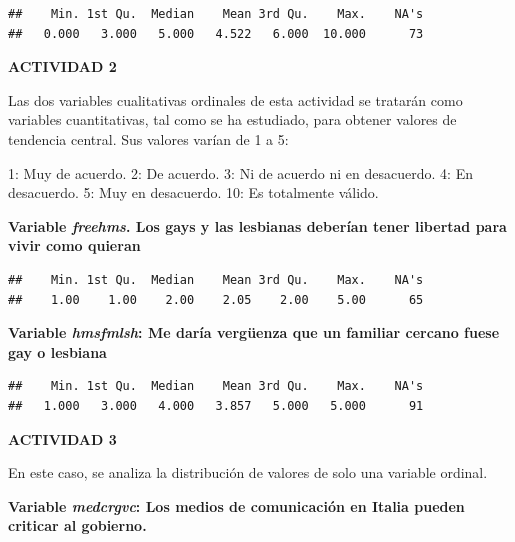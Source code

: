 \documentclass[
  12 pt,
  a4paper,
]{article}
\newenvironment{Shaded}{\begin{snugshade}}{\end{snugshade}}
\newcommand{\FunctionTok}[1]{\textcolor[rgb]{0.13,0.29,0.53}{\textbf{#1}}}
\newcommand{\NormalTok}[1]{#1}
\newcommand{\SpecialCharTok}[1]{\textcolor[rgb]{0.81,0.36,0.00}{\textbf{#1}}}
\begin{document}
\begin{verbatim}
##    Min. 1st Qu.  Median    Mean 3rd Qu.    Max.    NA's 
##   0.000   3.000   5.000   4.522   6.000  10.000      73
\end{verbatim}

\textbf{ACTIVIDAD 2}

Las dos variables cualitativas ordinales de esta actividad se tratarán
como variables cuantitativas, tal como se ha estudiado, para obtener
valores de tendencia central. Sus valores varían de 1 a 5:

1: Muy de acuerdo. 2: De acuerdo. 3: Ni de acuerdo ni en desacuerdo. 4:
En desacuerdo. 5: Muy en desacuerdo. 10: Es totalmente válido.

\textbf{Variable \emph{freehms}. Los gays y las lesbianas deberían tener
libertad para vivir como quieran}

\begin{Shaded}
\end{Shaded}

\begin{verbatim}
##    Min. 1st Qu.  Median    Mean 3rd Qu.    Max.    NA's 
##    1.00    1.00    2.00    2.05    2.00    5.00      65
\end{verbatim}

\textbf{Variable \emph{hmsfmlsh}: Me daría vergüenza que un familiar
cercano fuese gay o lesbiana}

\begin{Shaded}
\end{Shaded}

\begin{verbatim}
##    Min. 1st Qu.  Median    Mean 3rd Qu.    Max.    NA's 
##   1.000   3.000   4.000   3.857   5.000   5.000      91
\end{verbatim}

\newpage

\textbf{ACTIVIDAD 3}

En este caso, se analiza la distribución de valores de solo una variable
ordinal.

\textbf{Variable \emph{medcrgvc}: Los medios de comunicación en Italia
pueden criticar al gobierno.}
\end{document}
